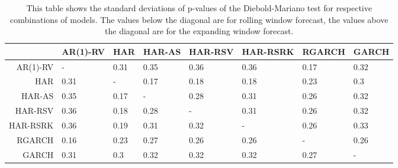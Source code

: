 \begin{table}[ht]
\centering
\begin{tabular}{rlllllll}
  \hline
 & AR(1)-RV & HAR & HAR-AS & HAR-RSV & HAR-RSRK & RGARCH & GARCH \\ 
  \hline
AR(1)-RV & - & 0.31 & 0.35 & 0.36 & 0.36 & 0.17 & 0.32 \\ 
  HAR & 0.31 & - & 0.17 & 0.18 & 0.18 & 0.23 & 0.3 \\ 
  HAR-AS & 0.35 & 0.17 & - & 0.28 & 0.31 & 0.26 & 0.32 \\ 
  HAR-RSV & 0.36 & 0.18 & 0.28 & - & 0.31 & 0.26 & 0.32 \\ 
  HAR-RSRK & 0.36 & 0.19 & 0.31 & 0.32 & - & 0.26 & 0.33 \\ 
  RGARCH & 0.16 & 0.23 & 0.27 & 0.26 & 0.26 & - & 0.26 \\ 
  GARCH & 0.31 & 0.3 & 0.32 & 0.32 & 0.32 & 0.27 & - \\ 
   \hline
\end{tabular}
\caption[DM test standard deviations]{This table shows the standard deviations of p-values of the Diebold-Mariano test for respective combinations of models. 
                The values below the diagonal are for rolling window forecast, the values above the diagonal are for the expanding window forecast.} 
\label{Table:DM_test_SD}
\end{table}
